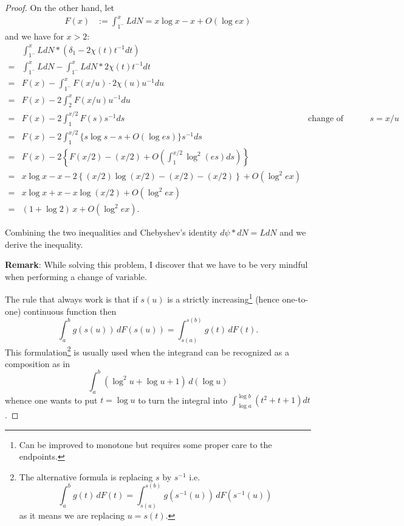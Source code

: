 \documentclass[12pt]{article}
\renewcommand{\O}[1]{O\left( #1 \right)}
\begin{document}
\begin{proof}
On the other hand, let
\begin{align*}
F(x) &:= \int_{1^-}^x L dN = x \log x - x + O(\log ex)
\end{align*}
and we have for $x > 2$:
\begin{align*}
&\int_{1^-}^x L dN * (\delta_1 - 2 \chi(t) t^{-1} dt)\\
=& \int_{1^-}^x L dN - \int_{1^-}^x L dN * 2 \chi(t) t^{-1} dt\\
=& F(x) - \int_{1^-}^x F(x/u) \cdot 2 \chi(u) u^{-1} du\\
=& F(x) - 2 \int_{2}^x F(x/u) u^{-1} du\\
=& F(x) - 2 \int_1^{x/2} F(s) s^{-1} ds &\text{change of variable } s = x/u\\
=& F(x) - 2 \int_1^{x/2} \{ s \log s - s + \O{ \log es } \} s^{-1} ds\\
=& F(x) - 2 \left\{ F(x/2) - (x/2) + \O{ \int_1^{x/2} \log^2(es) ds } \right\}\\
=& x \log x - x - 2 \left\{ (x/2) \log(x/2) - (x/2) - (x/2) \right\} + \O{ \log^2 ex }\\
=& x \log x + x - x \log(x/2) + \O{ \log^2 ex }\\
=& (1 + \log 2) \, x + \O{ \log^2 ex }.
\end{align*}

Combining the two inequalities and Chebyshev's identity $d\psi * dN = L dN$ and we derive the inequality.

\textbf{Remark}: While solving this problem, I discover that we have to be very mindful when performing a change of variable.

The rule that always work is that if $s(u)$ is a strictly increasing\footnote{Can be improved to monotone but requires some proper care to the endpoints.} (hence one-to-one) continuous function then
$$\int_{a}^{b} g(s(u)) \, dF(s(u)) = \int_{s(a)}^{s(b)} g(t) \, dF(t).$$
This formulation\footnote{The alternative formula is replacing $s$ by $s^{-1}$ i.e.
$$\int_a^b g(t) \, dF(t) = \int_{s(a)}^{s(b)} g(s^{-1}(u)) \, dF(s^{-1}(u))$$
as it means we are replacing $u = s(t)$.} is usually used when the integrand can be recognized as a composition as in
$$\int_a^b (\log^2 u + \log u + 1) \, d(\log u)$$
whence one wants to put $t = \log u$ to turn the integral into $\int_{\log a}^{\log b} (t^2 + t + 1) dt$.


\end{proof}
\end{document}
